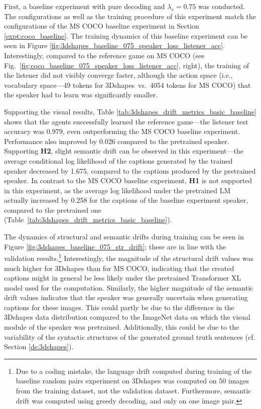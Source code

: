 First, a baseline experiment with pure decoding and $\lambda_s = 0.75$ was conducted.
The configurations as well as the training procedure of this experiment match the configurations of the MS COCO baseline experiment in Section \ref{expt:coco_baseline}. The training dynamics of this baseline experiment can be seen in Figure \ref{fig:3dshapes_baseline_075_speaker_loss_listener_acc}. Interestingly, compared to the reference game on MS COCO (see Fig.~\ref{fig:coco_baseline_075_speaker_loss_listener_acc}, right), the training of the listener did not visibly converge faster, although the action space (i.e., vocabulary space---49 tokens for 3Dshapes~vs.~4054 tokens for MS COCO) that the speaker had to learn was significantly smaller. 
 
Supporting the visual results, Table \ref{tab:3dshapes_drift_metrics_basic_baseline} shows that the agents successfully learned the reference game---the listener test accuracy was 0.979, even outperforming the MS COCO baseline experiment. Performance also improved by 0.026 compared to the pretrained speaker. 
Supporting \textbf{H2}, slight semantic drift can be observed in this experiment---the average conditional log likelihood of the captions generated by the trained speaker decreased by 1.675, compared to the captions produced by the pretrained speaker. In contrast to the MS COCO baseline experiment, \textbf{H1} is not supported in this experiment, as the average log likelihood under the pretrained LM actually increased by 0.258 for the captions of the baseline experiment speaker, compared to the pretrained one (Table~\ref{tab:3dshapes_drift_metrics_basic_baseline}).
 
The dynamics of structural and semantic drifts during training can be seen in Figure \ref{fig:3dshapes_baseline_075_str_drift}; these are in line with the validation results.\footnote{Due to a coding mistake, the language drift computed during training of the baseline random pairs experiment on 3Dshapes was computed on 50 images from the training dataset, not the validation dataset. Furthermore, semantic drift was computed using greedy decoding, and only on one image pair.} 
Interestingly, the magnitude of the structural drift values was much higher for 3Dshapes than for MS COCO, indicating that the created captions might in general be less likely under the pretrained Transformer XL model used for the computation. Similarly, the higher magnitude of the semantic drift values indicates that the speaker was generally uncertain when generating captions for these images. This could partly be due to the difference in the 3Dshapes data distribution compared to the ImageNet data on which the visual module of the speaker was pretrained. Additionally, this could be due to the variability of the syntactic structures of the generated ground truth sentences (cf. Section \ref{ds:3dshapes}). 

